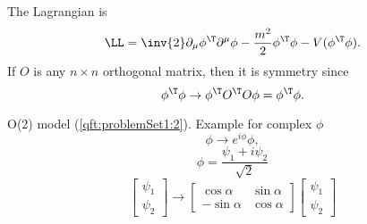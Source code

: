The Lagrangian is
\begin{equation}\label{eqn:qftLecture6:960}
\LL = \inv{2} \partial_\mu \phi^\T \partial^\mu \phi - \frac{m^2}{2} \phi^\T \phi - V(\phi^\T \phi).
\end{equation}
If \( O \) is any \( n \times n \) orthogonal matrix, then it is symmetry since
\begin{equation}\label{eqn:qftLecture6:980}
\phi^\T \phi \rightarrow \phi^\T O^\T O \phi = \phi^\T \phi.
\end{equation}

O(2) model (\cref{qft:problemSet1:2}).  Example for complex \( \phi \)
\begin{equation}\label{eqn:qftLecture6:1000}
\phi \rightarrow e^{i \phi} \phi,
\end{equation}
\begin{equation}\label{eqn:qftLecture6:1020}
\phi = \frac{\psi_1 + i \psi_2}{\sqrt{2}}
\end{equation}
\begin{equation}\label{eqn:qftLecture6:1040}
\begin{bmatrix}
\psi_1 \\
\psi_2
\end{bmatrix}
\rightarrow
\begin{bmatrix}
\cos\alpha & \sin\alpha \\
-\sin\alpha & \cos\alpha
\end{bmatrix}
\begin{bmatrix}
\psi_1 \\
\psi_2
\end{bmatrix}
\end{equation}
